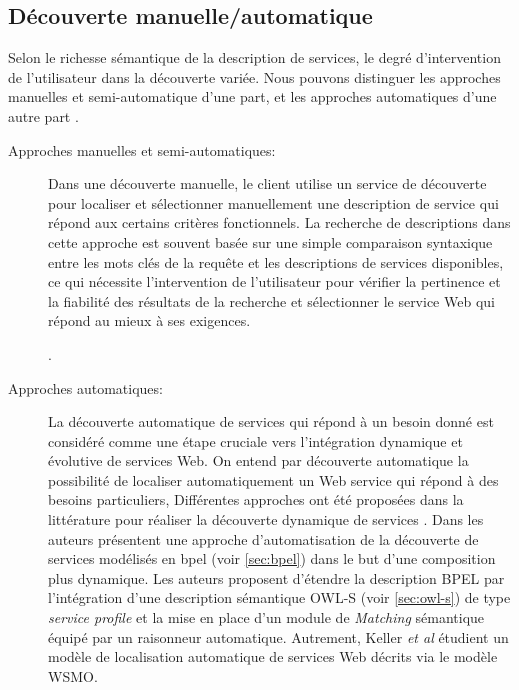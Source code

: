   \subsection{Découverte manuelle/automatique}
  \label{sec:ws-desc:manual-vs-auto}
  Selon le richesse sémantique de la description de services, le
  degré d'intervention de l'utilisateur dans la découverte
  variée. Nous pouvons distinguer les approches manuelles et
  semi-automatique d'une part, et les approches automatiques d'une
  autre part \cite{elie2010,garofalakis2004web}.

  \renewcommand{\descriptionlabel}[1]{\hspace{0.1cm}\textbullet~\textsf{#1}}
  \begin{description}
  \item[Approches manuelles et semi-automatiques:] Dans une découverte
    manuelle, le client utilise un service de découverte pour
    localiser et sélectionner manuellement une description de service
    qui répond aux certains critères fonctionnels. La recherche de
    descriptions dans cette approche est souvent basée sur une simple
    comparaison syntaxique entre les mots clés de la requête et les
    descriptions de services disponibles, ce qui nécessite
    l'intervention de l'utilisateur pour vérifier la pertinence et la
    fiabilité des résultats de la recherche et sélectionner le service
    Web qui répond au mieux à ses exigences.

    .

  \item[Approches automatiques:] La découverte automatique de services
    qui répond à un besoin donné est considéré comme une étape
    cruciale vers l'intégration dynamique et évolutive de services
    Web. On entend par découverte automatique la possibilité de
    localiser automatiquement un Web service qui répond à des besoins
    particuliers, Différentes approches ont été proposées dans la
    littérature pour réaliser la découverte dynamique de services
    \cite{paolucci2002semantic, bernstein2002discovering,
      mandell2003bottom,
      benatallah2005automating,keller2005automatic}. Dans
    \cite{mandell2003bottom} les auteurs présentent une approche
    d'automatisation de la découverte de services modélisés en
    \acrshort{bpel} (voir \ref{sec:bpel}) dans le but d'une
    composition plus dynamique. Les auteurs proposent d'étendre la
    description \textsc{BPEL} par l'intégration d'une description
    sémantique \textsc{OWL-S} (voir \ref{sec:owl-s}) de type
    \textit{service profile} et la mise en place d'un module de
    \textit{Matching} sémantique équipé par un raisonneur
    automatique. Autrement, Keller \textit{et al}
    \cite{keller2005automatic} étudient un modèle de localisation
    automatique de services Web décrits via le modèle \textsc{WSMO}.
  \end{description}

